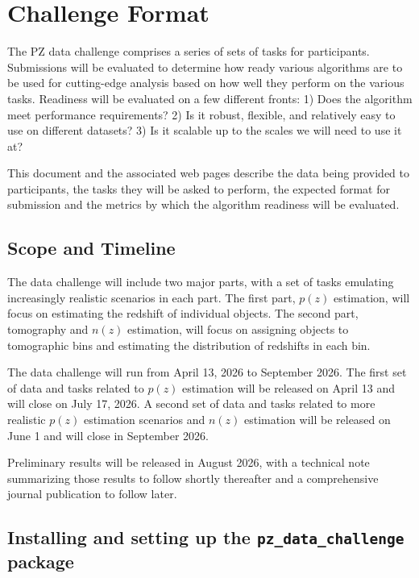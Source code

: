 \section{Challenge Format}
\label{sec:challenge_format}

The PZ data challenge comprises a series of sets of tasks for participants.
Submissions will be evaluated to determine how ready various algorithms are
to be used for cutting-edge analysis based on how well they perform on
the various tasks. Readiness will be evaluated on a few different
fronts: 1) Does the algorithm meet performance requirements? 2) Is
it robust, flexible, and relatively easy to use on different datasets?
3) Is it scalable up to the scales we will need to use it at?

This document and the associated web pages describe the data being
provided to participants, the tasks they will be asked to perform, the
expected format for submission and the metrics by which the algorithm
readiness will be evaluated.


\subsection{Scope and Timeline}

The data challenge will include two major parts, with a set of
tasks emulating increasingly realistic scenarios in each part. The
first part, $p(z)$ estimation, will focus on estimating the redshift of
individual objects. The second part, tomography and $n(z)$ estimation,
will focus on assigning objects to tomographic bins and estimating the
distribution of redshifts in each bin.

The data challenge will run from April 13, 2026 to September 2026.
The first set of data and tasks related to $p(z)$ estimation will be
released on April 13 and will close on July 17, 2026.   A second set
of data and tasks related to more realistic $p(z)$ estimation
scenarios and $n(z)$ estimation will be released on June 1 and will
close in September 2026.

Preliminary results will be released in August 2026, with a
technical note summarizing those results to follow shortly thereafter and
a comprehensive journal publication to follow later.


\subsection{Installing and setting up the \texttt{pz\_data\_challenge}
  package}

